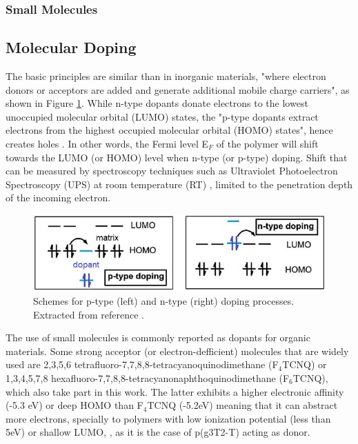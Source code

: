
\subsubsection{Small Molecules}

\subsection{Molecular Doping} \label{subsec:moldop}
The basic principles are similar than in inorganic materials, "where electron donors or acceptors are added and generate additional mobile charge carriers", as shown in Figure \ref{fig:doping}. While n-type dopants donate electrons to the lowest unoccupied molecular orbital (LUMO) states, the "p-type dopants extract electrons from the highest occupied molecular orbital (HOMO) states", hence creates holes \cite{lussemDopingOrganicSemiconductors2013}. In other words, the Fermi level E$_{F}$ of the polymer will shift towards the LUMO (or HOMO) level when n-type (or p-type) doping. Shift that can be measured by spectroscopy techniques such as Ultraviolet Photoelectron Spectroscopy (UPS) at room temperature (RT) \cite{tietzeFermiLevelShift2012}, limited to the penetration depth of the incoming electron.

\begin{figure}
  \centering
  \includegraphics[width=12cm]{Images/doping.jpg}
  \caption{Schemes for p-type (left) and n-type (right) doping processes. Extracted from reference \cite{lussemDopingOrganicSemiconductors2013}.}
  \label{fig:doping}
\end{figure}

The use of small molecules is commonly reported as dopants for organic materials. Some strong acceptor (or electron-defficient) molecules that are widely used are 2,3,5,6 tetrafluoro-7,7,8,8-tetracyanoquinodimethane (F$_{4}$TCNQ) or 1,3,4,5,7,8 hexafluoro-7,7,8,8-tetracyanonaphthoquinodimethane (F$_{6}$TCNQ), which also take part in this work. The latter exhibits a higher electronic affinity (-5.3 eV) or deep HOMO than F$_{4}$TCNQ (-5.2eV) meaning that it can abstract more electrons, specially to polymers with low ionization potential (less than 5eV) or shallow LUMO, \cite{kieferDoubleDopingConjugated2019}, as it is the case of p(g3T2-T) acting as donor.

